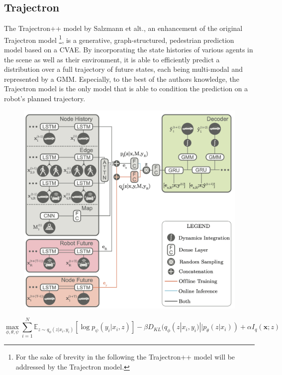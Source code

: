 \subsection{Trajectron}
The Trajectron++ model \cite{Salzmann2020} by Salzmann et alt., an enhancement of the original Trajectron model \cite{Ivanovic2018}\footnote{For the sake of brevity in the following the Trajectron++ model will be addressed by the Trajectron model.}, is a generative, graph-structured, pedestrian prediction model based on a C\ac{VAE}. By incorporating the state histories of various agents in the scene as well as their environment, it is able to efficiently predict a distribution over a full trajectory of future states, each being multi-modal and represented by a \ac{GMM}. Especially, to the best of the authors knowledge, the Trajectron model is the only model that is able to condition the prediction on a robot's planned trajectory.

\begin{figure}[!ht]
\begin{center}
\includegraphics[width=\imgwidth]{images/trajectron++.png}
\label{img:trajectron_model}
\end{center}
\end{figure}

\begin{equation}
\max_{\phi, \theta, \psi} \sum_{i=1}^N \mathbb{E}_{z \sim q_{\phi}(z | x_i, y_i)} [\log p_\psi (y_i | x_i, z)] - \beta D_{KL} (q_{\phi}(z | x_i, y_i) || p_{\theta}(z | x_i)) + \alpha I_q(\boldsymbol{x}; z)
\label{eq:trajectron_loss}
\end{equation}

